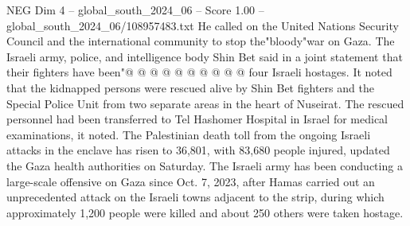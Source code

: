 \begin{textsample}{NEG Dim 4 – global\_south\_2024\_06 – Score 1.00 – global\_south\_2024\_06/108957483.txt}
He called on the United Nations Security Council and the international community to stop the"bloody"war on Gaza.
The Israeli army, police, and intelligence body Shin Bet said in a joint statement that their fighters have been"@ @ @ @ @ @ @ @ @ @ four Israeli hostages.
It noted that the kidnapped persons were rescued alive by Shin Bet fighters and the Special Police Unit from two separate areas in the heart of Nuseirat.
The rescued personnel had been transferred to Tel Hashomer Hospital in Israel for medical examinations, it noted.
The Palestinian death toll from the ongoing Israeli attacks in the enclave has risen to 36,801, with 83,680 people injured, updated the Gaza health authorities on Saturday.
The Israeli army has been conducting a large-scale offensive on Gaza since Oct. 7, 2023, after Hamas carried out an unprecedented attack on the Israeli towns adjacent to the strip, during which approximately 1,200 people were killed and about 250 others were taken hostage.

\end{textsample}
